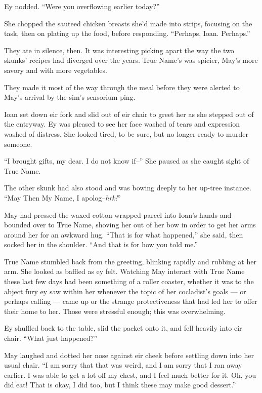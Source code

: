 Ey nodded. ``Were you overflowing earlier today?''

She chopped the sauteed chicken breasts she'd made into strips, focusing on the task, then on plating up the food, before responding. ``Perhaps, Ioan. Perhaps.''

They ate in silence, then. It was interesting picking apart the way the two skunks' recipes had diverged over the years. True Name's was spicier, May's more savory and with more vegetables.

They made it most of the way through the meal before they were alerted to May's arrival by the sim's sensorium ping.

Ioan set down eir fork and slid out of eir chair to greet her as she stepped out of the entryway. Ey was pleased to see her face washed of tears and expression washed of distress. She looked tired, to be sure, but no longer ready to murder someone.

``I brought gifts, my dear. I do not know if--'' She paused as she caught sight of True Name.

The other skunk had also stood and was bowing deeply to her up-tree instance. ``May Then My Name, I apolog--\emph{hrk!}''

May had pressed the waxed cotton-wrapped parcel into Ioan's hands and bounded over to True Name, shoving her out of her bow in order to get her arms around her for an awkward hug. ``That is for what happened,'' she said, then socked her in the shoulder. ``And that is for how you told me.''

True Name stumbled back from the greeting, blinking rapidly and rubbing at her arm. She looked as baffled as ey felt. Watching May interact with True Name these last few days had been something of a roller coaster, whether it was to the abject fury ey saw within her whenever the topic of her cocladist's goals — or perhaps calling — came up or the strange protectiveness that had led her to offer their home to her. Those were stressful enough; this was overwhelming.

Ey shuffled back to the table, slid the packet onto it, and fell heavily into eir chair. ``What just happened?''

May laughed and dotted her nose against eir cheek before settling down into her usual chair. ``I am sorry that that was weird, and I am sorry that I ran away earlier. I was able to get a lot off my chest, and I feel much better for it. Oh, you did eat! That is okay, I did too, but I think these may make good dessert.''

